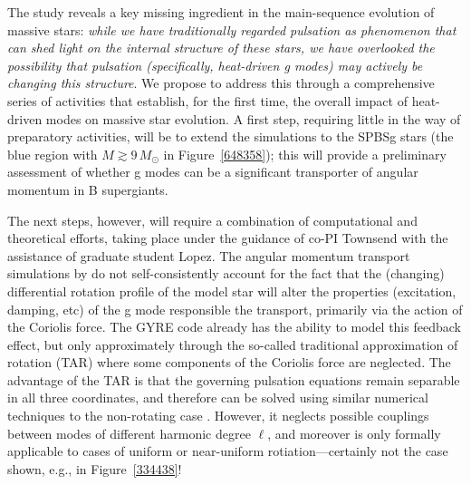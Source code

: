 The \citet{Townsend:2017} study reveals a key missing ingredient in the main-sequence evolution of massive stars: \emph{while we have traditionally regarded pulsation as phenomenon that can shed light on the internal structure of these stars, we have overlooked the possibility that pulsation (specifically, heat-driven g modes) may actively be changing this structure}. We propose to address this through a comprehensive series of activities that establish, for the first time, the overall impact of heat-driven modes on massive star evolution. A first step, requiring little in the way of preparatory activities, will be to extend the \citet{Townsend:2017} simulations to the SPBSg stars (the blue region with $M \gtrsim 9\,M_{\odot}$ in Figure~\ref{648358}); this will provide a preliminary assessment of whether g modes can be a significant transporter of angular momentum in B supergiants.

The next steps, however, will require a combination of computational and theoretical efforts, taking place under the guidance of co-PI Townsend with the assistance of graduate student Lopez. The angular momentum transport simulations by \citet{Townsend:2017} do not self-consistently account for the fact that the (changing) differential rotation profile of the model star will alter the properties (excitation, damping, etc) of the g mode responsible the transport, primarily via the action of the Coriolis force. The GYRE code already has the ability to model this feedback effect, but only approximately through the so-called traditional approximation of rotation (TAR) where some components of the Coriolis force are neglected. The advantage of the TAR is that the governing pulsation equations remain separable in all three coordinates, and therefore can be solved using similar numerical techniques to the non-rotating case \citep[see, e.g.,][for a demonstration of the TAR applied to rotating SPB stars]{Townsend:2005}. However, it neglects possible couplings between modes of different harmonic degree $\ell$, and moreover is only formally applicable to cases of uniform or near-uniform rotiation---certainly not the case shown, e.g., in Figure~\ref{334438}!

